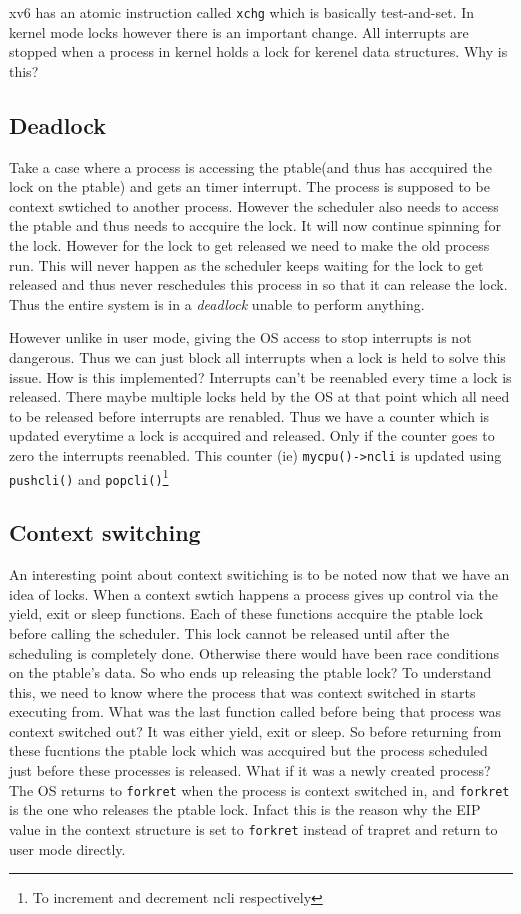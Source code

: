 \documentclass[12pt]{article}
\begin{document}
xv6 has an atomic instruction called \texttt{xchg} which is basically test-and-set. 
In kernel mode locks however there is an important change. All interrupts are stopped when a process in kernel holds a lock
for kerenel data structures. Why is this?

\subsection{Deadlock}
Take a case where a process is accessing the ptable(and thus has accquired the lock on the ptable) and gets an timer interrupt. The process is supposed to be context swtiched to another process. However the scheduler 
also needs to access the ptable and thus needs to accquire the lock. It will now continue spinning for the lock. However for the lock to get released we need to make the old process run. This will never happen as the scheduler keeps waiting for 
the lock to get released and thus never reschedules this process in so that it can release the lock. Thus the entire system is in a \textit{deadlock} unable to perform anything. 

However unlike in user mode, giving the OS access to stop interrupts is not dangerous. Thus we can just block all interrupts when a lock is held to solve this issue.
How is this implemented? Interrupts can't be reenabled every time a lock is released. There maybe multiple locks held by the OS at that point which all need to be released before interrupts are renabled. Thus we have a 
counter which is updated everytime a lock is accquired and released. Only if the counter goes to zero the interrupts reenabled. This counter (ie) \texttt{mycpu()->ncli} is updated using \texttt{pushcli()} and \texttt{popcli()}\footnote{To increment and decrement ncli respectively}

\subsection{Context switching}
An interesting point about context switiching is to be noted now that we have an idea of locks. When a context swtich happens a process gives up control via the yield, exit or sleep functions. Each of these functions accquire the ptable lock before calling the scheduler. This lock cannot be released until after the
scheduling is completely done. Otherwise there would have been race conditions on the ptable's data. So who ends up releasing the ptable lock? To understand this, we need to know where the process that was context switched in starts executing from. What was the last function called before being that process was context 
switched out? It was either yield, exit or sleep. So before returning from these fucntions the ptable lock which was accquired but the process scheduled just before these processes is released. What if it was a newly created process? The OS 
returns to \texttt{forkret} when the process is context switched in, and \texttt{forkret} is the one who releases the ptable lock. Infact this is the reason why the EIP value in the context structure is set to \texttt{forkret} instead of trapret and return to user mode directly.
\end{document}
